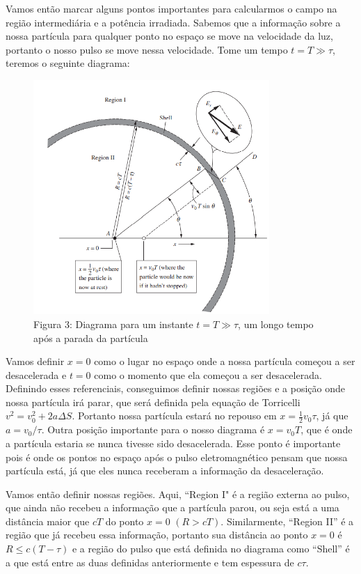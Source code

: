 \documentclass[12pt, letterpaper]{article}
\begin{document}
    Vamos então marcar alguns pontos importantes para calcularmos o campo na região intermediária e a potência irradiada. Sabemos que a informação sobre a nossa partícula para qualquer ponto no espaço se move na velocidade da luz, portanto o nosso pulso se move nessa velocidade. Tome um tempo $t = T \gg \tau$, teremos o seguinte diagrama:

    \begin{figure}[h]
        \centering
        \includegraphics[width=0.8\textwidth]{diagrama}
        \\{Figura 3: Diagrama para um instante $t = T \gg \tau$, um longo tempo após a parada da partícula}
        \label{fig:fig3}
    \end{figure}

    Vamos definir $x = 0$ como o lugar no espaço onde a nossa partícula começou a ser desacelerada e $t = 0$ como o momento que ela começou a ser desacelerada. Definindo esses referenciais, conseguimos definir nossas regiões e a posição onde nossa partícula irá parar, que será definida pela equação de Torricelli $v^2 = v_0 ^2 + 2a\Delta S$. Portanto nossa partícula estará no repouso em $x = \frac{1}{2} v_0 \tau$, já que $a = v_0 /\tau$. Outra posição importante para o nosso diagrama é $x = v_0 T$, que é onde a partícula estaria se nunca tivesse sido desacelerada. Esse ponto é importante pois é onde os pontos no espaço após o pulso eletromagnético pensam que nossa partícula está, já que eles nunca receberam a informação da desaceleração.

    Vamos então definir nossas regiões. Aqui, ``Region I" é a região externa ao pulso, que ainda não recebeu a informação que a partícula parou, ou seja está a uma distância maior que $cT$ do ponto $x = 0$ $(R > cT)$. Similarmente, ``Region II'' é a região que já recebeu essa informação, portanto sua distância ao ponto $x = 0$ é $R \leq c(T - \tau)$ e a região do pulso que está definida no diagrama como ``Shell'' é a que está entre as duas definidas anteriormente e tem espessura de $c\tau$.
\end{document}
